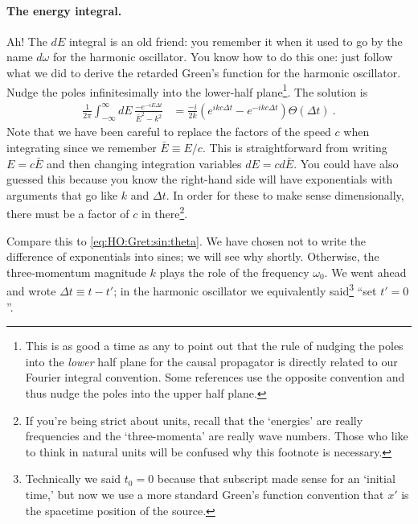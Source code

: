 \documentclass[
  11pt,
	colorful,
	raggedright,
]{tufte-style-thesis-flip}
\begin{document}
\paragraph{The energy integral.} Ah! The $dE$ integral is an old friend: you remember it when it used to go by the name $d\omega$ for the harmonic oscillator. You know how to do this one: just follow what we did to derive the retarded Green's function for the harmonic oscillator. Nudge the poles infinitesimally into the lower-half plane\footnote{This is as good a time as any to point out that the rule of nudging the poles into the \emph{lower} half plane for the causal propagator is directly related to our Fourier integral convention. Some references use the opposite convention and thus nudge the poles into the upper half plane.}. The solution is
\begin{align}
   \frac{1}{2\pi}\int_{-\infty}^\infty dE \, 
  \frac{-e^{-iE \Delta t}}{\bar{E}^2-k^2}
  &= \frac{-i}{2k}\left(e^{ikc\Delta t} - e^{-ikc\Delta t}\right)\Theta(\Delta t) \ .
\end{align}
Note that we have been careful to replace the factors of the speed $c$ when integrating since we remember $\bar E \equiv E/c$. This is straightforward from writing $E = c\bar E$ and then changing integration variables $dE = cd\bar{E}$. You could have also guessed this because you know the right-hand side will have exponentials with arguments that go like $k$ and $\Delta t$. In order for these to make sense dimensionally, there must be a factor of $c$ in there\footnote{If you're being strict about units, recall that the `energies' are really frequencies and the `three-momenta' are really wave numbers. Those who like to think in natural units will be confused why this footnote is necessary.}.

Compare this to \eqref{eq:HO:Gret:sin:theta}. We have chosen not to write the difference of exponentials into sines; we will see why shortly. Otherwise, the three-momentum magnitude $k$ plays the role of the frequency $\omega_0$. We went ahead and wrote $\Delta t \equiv t-t'$; in the harmonic oscillator we equivalently said\footnote{Technically we said $t_0=0$ because that subscript made sense for an `initial time,' but now we use a more standard Green's function convention that $x'$ is the spacetime position of the source.} ``set $t'=0$''. 
\end{document}
